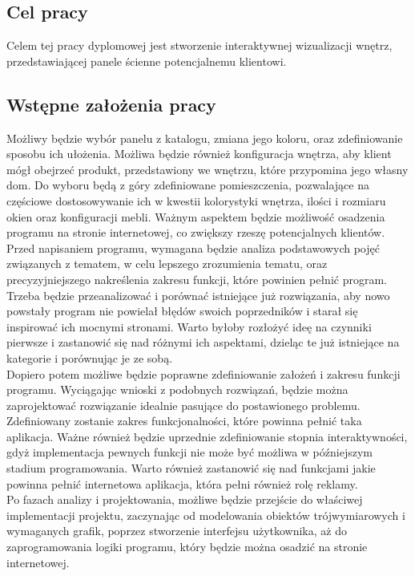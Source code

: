 \documentclass{article} %
\begin{document}
\subsection{Cel pracy}
Celem tej pracy dyplomowej jest stworzenie interaktywnej wizualizacji wnętrz, przedstawiającej panele ścienne potencjalnemu klientowi. 
\\

\subsection{Wstępne założenia pracy}
Możliwy będzie wybór panelu z katalogu, zmiana jego koloru, oraz zdefiniowanie sposobu ich ułożenia. Możliwa będzie również konfiguracja wnętrza, aby klient mógł obejrzeć produkt, przedstawiony we wnętrzu, które przypomina jego własny dom. Do wyboru będą z góry zdefiniowane pomieszczenia, pozwalające na częściowe dostosowywanie ich w kwestii kolorystyki wnętrza, ilości i rozmiaru okien oraz konfiguracji mebli. Ważnym aspektem będzie możliwość osadzenia programu na stronie internetowej, co zwiększy rzeszę potencjalnych klientów.
\\

Przed napisaniem programu, wymagana będzie analiza podstawowych pojęć związanych z tematem, w celu lepszego zrozumienia tematu, oraz precyzyjniejszego nakreślenia zakresu funkcji, które powinien pełnić program. Trzeba będzie przeanalizować i porównać istniejące już rozwiązania, aby nowo powstały program nie powielał błędów swoich poprzedników i starał się inspirować ich mocnymi stronami. Warto byłoby rozłożyć ideę na czynniki pierwsze i zastanowić się nad różnymi ich aspektami, dzieląc te już istniejące na kategorie i porównując je ze sobą.
\\

Dopiero potem możliwe będzie poprawne zdefiniowanie założeń i zakresu funkcji programu. Wyciągając wnioski z podobnych rozwiązań, będzie można zaprojektować rozwiązanie idealnie pasujące do postawionego problemu. Zdefiniowany zostanie zakres funkcjonalności, które powinna pełnić taka aplikacja. Ważne również będzie uprzednie zdefiniowanie stopnia interaktywności, gdyż implementacja pewnych funkcji nie może być możliwa w późniejszym stadium programowania. Warto również zastanowić się nad funkcjami jakie powinna pełnić internetowa aplikacja, która pełni również rolę reklamy.
\\

Po fazach analizy i projektowania, możliwe będzie przejście do właściwej implementacji projektu, zaczynając od modelowania obiektów trójwymiarowych i wymaganych grafik, poprzez stworzenie interfejsu użytkownika, aż do  zaprogramowania logiki programu, który będzie można osadzić na stronie internetowej.
\\
\end{document}
